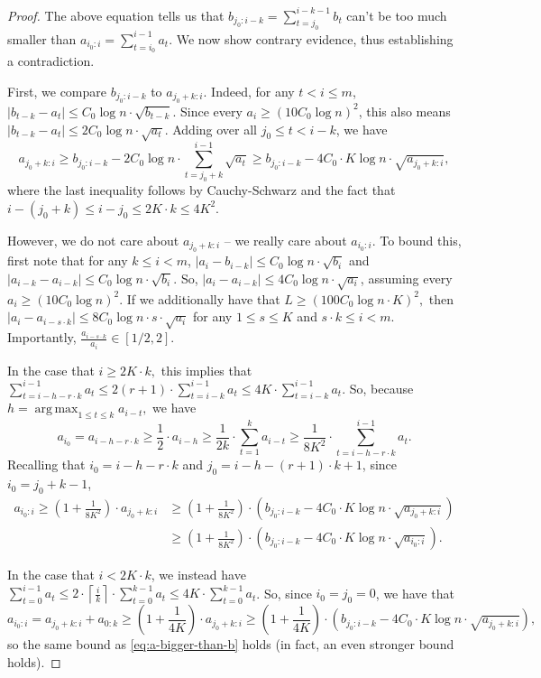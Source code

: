 \documentclass[12pt]{article}
\theoremstyle{definition}
\theoremstyle{remark}
\DeclareMathOperator*{\argmax}{arg\,max}
\begin{document}
\begin{proof}
    The above equation tells us that $b_{j_0:i-k} = \sum_{t = j_0}^{i-k-1} b_t$ can't be too much smaller than $a_{i_0:i} = \sum_{t = i_0}^{i-1} a_t$. We now show contrary evidence, thus establishing a contradiction.

    First, we compare $b_{j_0:i-k}$ to $a_{j_0+k:i}$. Indeed, for any $t < i \le m$, $|b_{t-k}-a_t| \le C_0 \log n \cdot \sqrt{b_{t-k}}$. Since every $a_i \ge (10 C_0 \log n)^2$, this also means $|b_{t-k}-a_t| \le 2 C_0 \log n \cdot \sqrt{a_t}$. Adding over all $j_0 \le t < i-k$, we have 
\[a_{j_0+k:i} \ge b_{j_0:i-k} - 2 C_0 \log n \cdot \sum_{t=j_0+k}^{i-1} \sqrt{a_t} \ge b_{j_0:i-k} - 4 C_0 \cdot K \log n \cdot \sqrt{a_{j_0+k:i}},\]
    where the last inequality follows by Cauchy-Schwarz and the fact that $i-(j_0+k) \le i-j_0 \le 2K \cdot k \le 4K^2$.

    However, we do not care about $a_{j_0+k:i}$ -- we really care about $a_{i_0:i}$. To bound this, first note that for any $k \le i < m$, $|a_i-b_{i-k}| \le C_0 \log n \cdot \sqrt{b_i}$ and $|a_{i-k}-a_{i-k}| \le C_0 \log n \cdot \sqrt{b_i}$. So, $|a_i-a_{i-k}| \le 4 C_0 \log n \cdot \sqrt{a_i}$, assuming every $a_i \ge (10 C_0 \log n)^2$.
    If we additionally have that $L \ge (100 C_0 \log n \cdot K)^2,$ then $|a_i-a_{i-s \cdot k}| \le 8 C_0 \log n \cdot s \cdot \sqrt{a_i}$ for any $1 \le s \le K$ and $s \cdot k \le i < m$. Importantly, $\frac{a_{i-s \cdot k}}{a_i} \in [1/2, 2]$.
    
    In the case that $i \ge 2K \cdot k,$ this implies that $\sum_{t = i-h-r \cdot k}^{i-1} a_t \le 2 (r+1) \cdot \sum_{t = i-k}^{i-1} a_t \le 4K \cdot \sum_{t = i-k}^{i-1} a_t$. So, because $h = \argmax_{1 \le t \le k} a_{i-t},$ we have
    \[a_{i_0} = a_{i-h-r \cdot k} \ge \frac{1}{2} \cdot a_{i-h} \ge \frac{1}{2k} \cdot \sum_{t=1}^k a_{i-t} \ge \frac{1}{8K^2} \cdot \sum_{t = i-h-r \cdot k}^{i-1} a_t.\]
    Recalling that $i_0 = i-h-r \cdot k$ and $j_0 = i-h-(r+1) \cdot k + 1$, since $i_0 = j_0+k-1$, 
\begin{align} \label{eq:a-bigger-than-b}
    a_{i_0:i} \ge \left(1+\frac{1}{8K^2}\right) \cdot a_{j_0+k:i} &\ge \left(1+\frac{1}{8K^2}\right) \cdot (b_{j_0:i-k} - 4C_0 \cdot K \log n \cdot \sqrt{a_{j_0+k:i}}) \nonumber \\
    &\ge \left(1+\frac{1}{8K^2}\right) \cdot (b_{j_0:i-k} - 4C_0 \cdot K \log n \cdot \sqrt{a_{i_0:i}}).
\end{align}
    
    In the case that $i < 2K \cdot k$, we instead have $\sum_{t=0}^{i-1} a_t \le 2 \cdot \left\lceil \frac{i}{k}\right\rceil \cdot \sum_{t=0}^{k-1} a_t \le 4K \cdot \sum_{t=0}^{k-1} a_t$. So, since $i_0 = j_0 = 0$, we have that 
\[a_{i_0:i} = a_{j_0+k:i}+a_{0:k} \ge \left(1 + \frac{1}{4K}\right) \cdot a_{j_0+k:i} \ge \left(1+\frac{1}{4K}\right) \cdot (b_{j_0:i-k} - 4C_0 \cdot K \log n \cdot \sqrt{a_{j_0+k:i}}),\]
    so the same bound as \eqref{eq:a-bigger-than-b} holds (in fact, an even stronger bound holds).


\end{proof}
\end{document}
